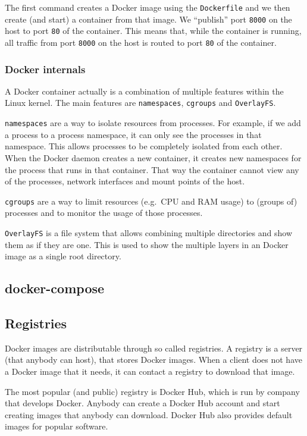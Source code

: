 The first command creates a Docker image using the \lstinline{Dockerfile} and we then create (and start) a container from that image. We ``publish'' port \lstinline{8000} on the host to port \lstinline{80} of the container. This means that, while the container is running, all traffic from port \lstinline{8000} on the host is routed to port \lstinline{80} of the container.

\subsubsection{Docker internals}

A Docker container actually is a combination of multiple features within the Linux kernel. The main features are \lstinline{namespaces}, \lstinline{cgroups} and \lstinline{OverlayFS}.

\hfill

\lstinline{namespaces} are a way to isolate resources from processes. For example, if we add a process to a process namespace, it can only see the processes in that namespace. This allows processes to be completely isolated from each other. When the Docker daemon creates a new container, it creates new namespaces for the process that runs in that container. That way the container cannot view any of the processes, network interfaces and mount points of the host.

\hfill

\lstinline{cgroups} are a way to limit resources (e.g.\ CPU and RAM usage) to (groups of) processes and to monitor the usage of those processes.

\hfill

\lstinline{OverlayFS} is a file system that allows combining multiple directories and show them as if they are one. This is used to show the multiple layers in an Docker image as a single root directory.


\subsection{docker-compose}

\subsection{Registries}

Docker images are distributable through so called registries. A registry is a server (that anybody can host), that stores Docker images. When a client does not have a Docker image that it needs, it can contact a registry to download that image.

\hfill

The most popular (and public) registry is Docker Hub, which is run by company that develops Docker.
Anybody can create a Docker Hub account and start creating images that anybody can download. Docker Hub also provides default images for popular software.
